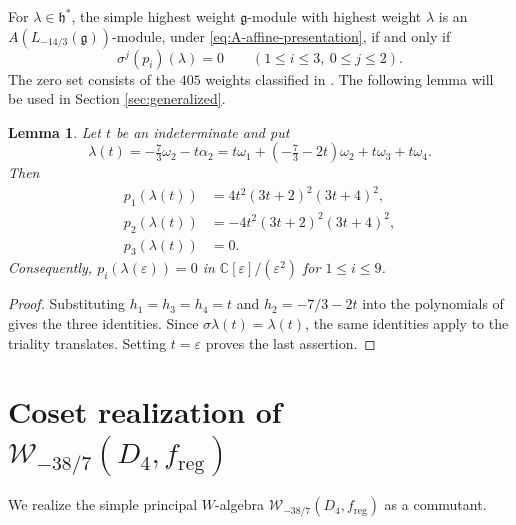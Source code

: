 \documentclass[11pt]{amsart}
\numberwithin{equation}{section}
\newtheorem{lemma}[theorem]{Lemma}
\theoremstyle{definition}
\theoremstyle{remark}
\newcommand{\CC}{\mathbb C}
\newcommand{\g}{\mathfrak g}
\newcommand{\h}{\mathfrak h}
\newcommand{\W}{\mathcal W}
\newcommand{\D}{\mathbb D}
\newcommand{\reg}{\mathrm{reg}}
\begin{document}
For $\lambda\in\h^*$, the simple highest weight
$\g$-module with highest weight $\lambda$ is an
$A(L_{-14/3}(\g))$-module, under \eqref{eq:A-affine-presentation}, if and only if
\[
 \sigma^j(p_i)(\lambda)=0
 \qquad(1\leq i\leq3,\ 0\leq j\leq2).
\]
The zero set consists of the $405$ weights classified in
\cite[Proposition 3.4 and Theorem 3.6]{AV}. %
The following lemma will be used in Section \ref{sec:generalized}.

\begin{lemma}\label{lem:AV-tangent}
Let $t$ be an indeterminate and put
\[
 \lambda(t)=-\tfrac73\omega_2-t\alpha_2
 =t\omega_1+(-\tfrac73-2t)\omega_2+t\omega_3+t\omega_4.
\]
Then
\begin{align*}
 p_1(\lambda(t))&=4t^2(3t+2)^2(3t+4)^2,\\
 p_2(\lambda(t))&=-4t^2(3t+2)^2(3t+4)^2,\\
 p_3(\lambda(t))&=0.
\end{align*}
Consequently, $p_i(\lambda(\varepsilon))=0$ in
$\CC[\varepsilon]/(\varepsilon^2)$ for $1\leq i\leq9$.

\end{lemma}

\begin{proof}
Substituting $h_1=h_3=h_4=t$ and $h_2=-7/3-2t$ into the polynomials
of \cite[Lemma~3.3]{AV} gives the three identities. Since
$\sigma\lambda(t)=\lambda(t)$, the same identities apply to the
triality translates. Setting $t=\varepsilon$ proves the last assertion.

\end{proof}


\section{Coset realization of \texorpdfstring{$\W_{-38/7}(D_4,f_{\reg})$}{W(-38/7)(D4, f reg)}}
\label{sec:coset}
We realize the simple principal $W$-algebra $\W_{-38/7}(D_4,f_{\reg})$ as a commutant.
\vskip 5mm
\end{document}
